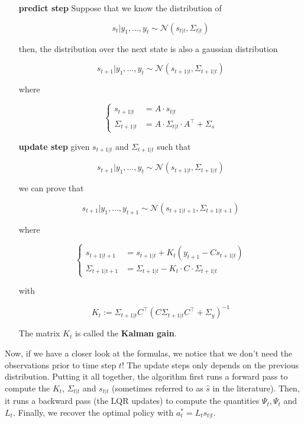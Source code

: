 \documentclass{article}
\begin{document}
\begin{enumerate}
	\item[\textbf{predict step}] Suppose that we know the distribution of
	
	\[ s_t | y_1, \dots, y_t \sim \mathcal{N} \left(s_{t|t}, \Sigma_{t|t}\right) \]
	
	then, the distribution over the next state is also a gaussian distribution
	
	\[ s_{t+1} | y_1, \dots, y_t \sim  \mathcal{N} \left(s_{t+1|t}, \Sigma_{t+1|t}\right) \]
	
	where
	
	\[ \begin{cases}
	s_{t+1|t} &= A \cdot s_{t | t}\\
	\Sigma_{t+1|t} &= A \cdot \Sigma_{t|t} \cdot A^\top + \Sigma_s
	\end{cases} \]
	
	\item[\textbf{update step}] given $ s_{t+1 |t} $ and $ \Sigma_{t+1|t} $ such that 
	
		\[ s_{t+1} | y_1, \dots, y_t \sim  \mathcal{N} \left(s_{t+1|t}, \Sigma_{t+1|t}\right) \]
		
		we can prove that 
		
		\[ s_{t+1} | y_1, \dots, y_{t+1} \sim \mathcal{N} \left( s_{t+1 | t+1}, \Sigma_{t+1|t+1} \right) \]
	
		where
		
		\[ \begin{cases}
		s_{t+1 | t+1} &= s_{t+1 | t} + K_t (y_{t+1} - C s_{t+1 | t})\\
		\Sigma_{t+1|t+1} &= \Sigma_{t+1|t} - K_t \cdot C \cdot \Sigma_{t+1|t}
		\end{cases} \]
		
		with 
		
		\[ K_t := \Sigma_{t+1|t} C^\top (C \Sigma_{t+1|t} C^\top + \Sigma_y)^{-1} \]
		
		The matrix $ K_t $ is called the \textbf{Kalman gain}.
\end{enumerate}

Now, if we have a closer look at the formulas, we notice that we don't need the observations prior to time step $ t $! The update steps only depends on the previous distribution. Putting it all together, the algorithm first runs a forward pass to compute the $ K_t $, $ \Sigma_{t|t} $ and $ s_{t|t} $ (sometimes referred to as $ \hat{s} $ in the literature). Then, it runs a backward pass (the LQR updates) to compute the quantities $ \Psi_{t}, \Psi_t $ and $ L_t $. Finally, we recover the optimal policy with $ a^*_t = L_t s_{t|t} $.

\end{document}
